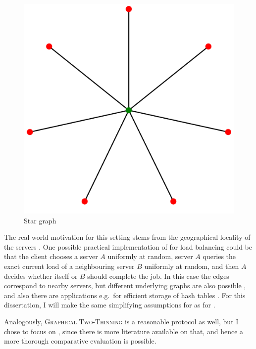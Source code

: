 \begin{figure}[hbt!] \label{star-graph}
    \centering
    \includegraphics[scale=0.1]{Chapter2/Figs/star_graph.png}
    \caption{Star graph \cite{stargraph}}
\end{figure}


The real-world motivation for this setting stems from the geographical locality of the servers \cite{krishnaram2006graphicaltwochoiceoriginal}. One possible practical implementation of \GraphicalTwoChoice for load balancing could be that the client chooses a server $A$ uniformly at random, server $A$ queries the exact current load of a neighbouring server $B$ uniformly at random, and then $A$ decides whether itself or $B$ should complete the job. In this case the edges correspond to nearby servers, but different underlying graphs are also possible \cite{peres2015oneplusbeta}, and also there are applications e.g.\ for efficient storage of hash tables \cite{krishnaram2006graphicaltwochoiceoriginal}. For this dissertation, I will make the same simplifying assumptions for \GraphicalTwoChoice as for \TwoThinning. 


Analogously, \textsc{Graphical Two-Thinning} is a reasonable protocol as well, but I chose to focus on \GraphicalTwoChoice, since there is more literature available on that, and hence a more thorough comparative evaluation is possible.\\


